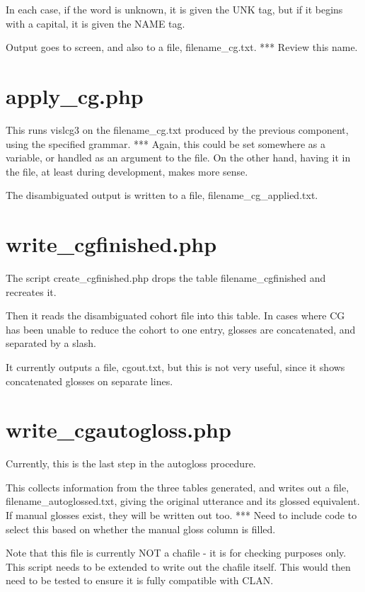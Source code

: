 \documentclass[a4paper,10pt]{article}
\begin{document}
{In each case, if the word is unknown, it is given the UNK tag, but if it begins with a capital, it is given the NAME tag.

Output goes to screen, and also to a file, filename\_cg.txt.
*** Review this name.


\section{apply\_cg.php}
\label{sec:applycg}

This runs vislcg3 on the filename\_cg.txt produced by the previous component, using the specified grammar.
*** Again, this could be set somewhere as a variable, or handled as an argument to the file.  On the other hand, having it in the file, at least during development, makes more sense.

The disambiguated output is written to a file, filename\_cg\_applied.txt.


\section{write\_cgfinished.php}
\label{sec:cgfinished}

The script create\_cgfinished.php drops the table filename\_cgfinished and recreates it.

Then it reads the disambiguated cohort file into this table.  In cases where CG has been unable to reduce the cohort to one entry, glosses are concatenated, and separated by a slash.

It currently outputs a file, cgout.txt, but this is not very useful, since it shows concatenated glosses on separate lines.


\section{write\_cgautogloss.php}
\label{sec:autoglossed}

Currently, this is the last step in the autogloss procedure.  

This collects information from the three tables generated, and writes out a file, filename\_autoglossed.txt, giving the original utterance and its glossed equivalent.  If manual glosses exist, they will be written out too.
*** Need to include code to select this based on whether the manual gloss column is filled.

Note that this file is currently NOT a chafile - it is for checking purposes only.  This script needs to be extended to write out the chafile itself.  This would then need to be tested to ensure it is fully compatible with CLAN.


}
\end{document}
